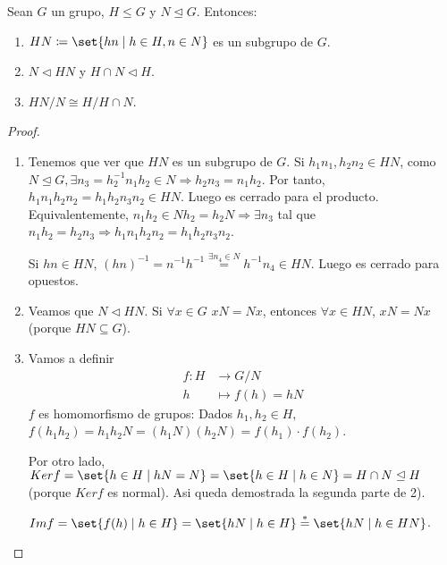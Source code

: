 \begin{theorem}
	Sean \(G \) un grupo, \(H \leq G \) y \(N \trianglelefteq G \). Entonces:
	\begin{enumerate}
		\item \(HN \coloneqq \set{hn \mid h \in H, n \in N }\) es un subgrupo de \(G \).
		\item \(N \triangleleft HN \) y \(H \cap N \triangleleft H \).
		\item \(HN / N \cong H / H \cap N\).
	\end{enumerate}
\end{theorem}
\begin{proof}
	\begin{enumerate}
		\item Tenemos que ver que \(HN \) es un subgrupo de \(G \). Si \(h_1 n_1, h_2 n_2 \in HN \), como \(N \trianglelefteq G, \exists n_3 = h^{-1}_2 n_1 h_2 \in N \Rightarrow h_2 n_3 = n_1 h_2 \). Por tanto, \(h_1 n_1 h_2 n_2 = h_1 h_2 n_3 n_2 \in HN \). Luego es cerrado para el producto. Equivalentemente, \(n_1 h_2 \in Nh_2 = h_2 N \Rightarrow \exists n_3 \) tal que \(n_1 h_2 = h_2 n_3 \Rightarrow h_1 n_1 h_2 n_2 = h_1 h_2 n_3 n_2\).
		      
		      Si \(hn \in HN \), \((hn)^{-1} = n^{-1} h^{-1} \overset{\exists n_4 \in N} = h^{-1} n_4 \in HN \). Luego es cerrado para opuestos.
		      
		\item Veamos que \(N \triangleleft HN  \). Si \(\forall x \in G \) \(xN = Nx \), entonces \(\forall x \in HN\), \(xN = Nx  \) (porque \(HN \subseteq G \)).
		\item Vamos a definir
		      \[
			      \begin{aligned}
				      f \colon H & \longrightarrow G / N    \\
				      h          & \longmapsto f (h ) = hN
			      \end{aligned}
		      \]
		      \(f \) es homomorfismo de grupos: Dados \(h_1, h_2 \in H \), \(f(h_1 h_2) = h_1 h_2 N = (h_1 N)(h_2 N) = f(h_1 ) \cdot f(h_2 )\).
		      
		      Por otro lado, \(Kerf = \set{ h \in H \mid hN = N } = \set{h \in H \mid h \in N} = H \cap N \trianglelefteq H\) (porque \(Kerf \) es normal). Asi queda demostrada la segunda parte de 2).
		      
		      \(Imf = \set{f(h) \mid h \in H} = \set{hN \mid h \in H} \overset{*}{=} \set{hN \mid h \in HN }\).
		      

\end{enumerate}
\end{proof}
